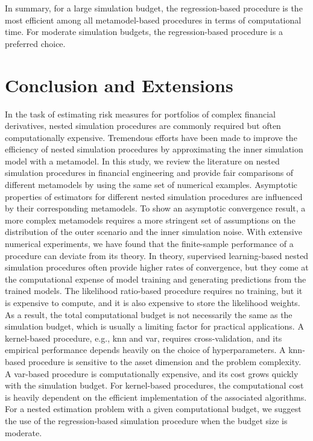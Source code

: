 In summary, for a large simulation budget, the regression-based procedure is the most efficient among all metamodel-based procedures in terms of computational time.
For moderate simulation budgets, the regression-based procedure is a preferred choice.

\section{Conclusion and Extensions}\label{sec1:conclusion}
In the task of estimating risk measures for portfolios of complex financial derivatives, nested simulation procedures are commonly required but often computationally expensive. 
Tremendous efforts have been made to improve the efficiency of nested simulation procedures by approximating the inner simulation model with a metamodel. 
In this study, we review the literature on nested simulation procedures in financial engineering and provide fair comparisons of different metamodels by using the same set of numerical examples. 
Asymptotic properties of estimators for different nested simulation procedures are influenced by their corresponding metamodels.
To show an asymptotic convergence result, a more complex metamodels requires a more stringent set of assumptions on the distribution of the outer scenario and the inner simulation noise.
With extensive numerical experiments, we have found that the finite-sample performance of a procedure can deviate from its theory. 
In theory, supervised learning-based nested simulation procedures often provide higher rates of convergence, but they come at the computational expense of model training and generating predictions from the trained models. 
The likelihood ratio-based procedure requires no training, but it is expensive to compute, and it is also expensive to store the likelihood weights.
As a result, the total computational budget is not necessarily the same as the simulation budget, which is usually a limiting factor for practical applications.
A kernel-based procedure, e.g., \gls{knn} and \gls{var}, requires cross-validation, and its empirical performance depends heavily on the choice of hyperparameters.
A \gls{knn}-based procedure is sensitive to the asset dimension and the problem complexity.
A \gls{var}-based procedure is computationally expensive, and its cost grows quickly with the simulation budget.
For kernel-based procedures, the computational cost is heavily dependent on the efficient implementation of the associated algorithms.
For a nested estimation problem with a given computational budget, we suggest the use of the regression-based simulation procedure when the budget size is moderate. 
